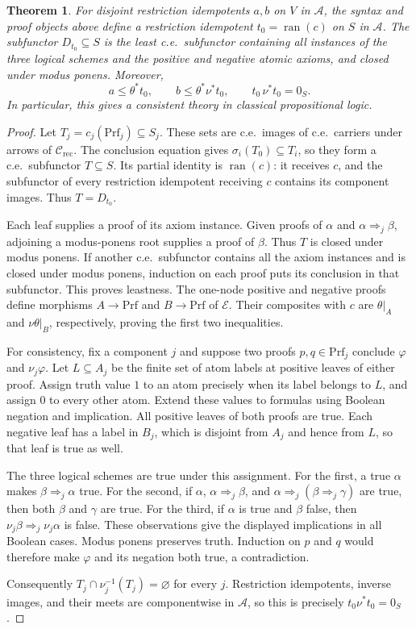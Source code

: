 \documentclass[11pt]{article}
\newtheorem{theorem}{Theorem}[section]
\newcommand{\ran}{\operatorname{ran}}
\begin{document}
\begin{theorem}\label{thm:fork-proof-presentation}
For disjoint restriction idempotents $a,b$ on $V$ in $\mathcal A$, the syntax and
proof objects above define a restriction idempotent $t_0=\ran(c)$ on $S$ in
$\mathcal A$. The subfunctor $D_{t_0}\subseteq S$ is the least c.e.\
subfunctor containing all instances of the three logical schemes and the
positive and negative atomic axioms, and closed under modus ponens.
Moreover,
\[
 a\le\theta^*t_0,\qquad
 b\le\theta^*\nu^*t_0,\qquad
 t_0\,\nu^*t_0=0_S.
\]
In particular, this gives a consistent theory in classical propositional logic.
\end{theorem}
\begin{proof}
Let $T_j=c_j(\mathrm{Prf}_j)\subseteq S_j$.
These sets are c.e.\ images of c.e.\ carriers under
arrows of $\mathcal C_{\mathrm{rec}}$. The conclusion equation gives
$\sigma_i(T_0)\subseteq T_i$, so they form a c.e.\
subfunctor $T\subseteq S$. Its partial identity is
$\ran(c)$: it receives $c$, and the subfunctor of every restriction
idempotent receiving $c$ contains its component images. Thus $T=D_{t_0}$.

Each leaf supplies a proof of its axiom instance. Given proofs
of $\alpha$ and $\alpha\Rightarrow_j\beta$, adjoining a
modus-ponens root supplies a proof of $\beta$. Thus $T$ is
closed under modus ponens. If another c.e.\ subfunctor contains all
the axiom instances and is closed under modus ponens, induction
on each proof puts its conclusion in that subfunctor. This
proves leastness. The one-node positive and negative proofs define
morphisms $A\to\mathrm{Prf}$ and $B\to\mathrm{Prf}$ of $\mathcal E$.
Their composites with $c$ are $\theta|_A$ and
$\nu\theta|_B$, respectively, proving the first two inequalities.

For consistency, fix a component $j$ and suppose two proofs
$p,q\in\mathrm{Prf}_j$ conclude $\varphi$ and $\nu_j\varphi$.
Let $L\subseteq A_j$ be the finite set of atom labels at
positive leaves of either proof. Assign truth value $1$ to an
atom precisely when its label belongs to $L$, and assign $0$
to every other atom. Extend these values to formulas using
Boolean negation and implication.
All positive leaves of both proofs are true. Each negative
leaf has a label in $B_j$, which is disjoint from $A_j$ and
hence from $L$, so that leaf is true as well.

The three logical schemes are true under this assignment.
For the first, a true $\alpha$ makes
$\beta\Rightarrow_j\alpha$ true. For the second, if
$\alpha$, $\alpha\Rightarrow_j\beta$, and
$\alpha\Rightarrow_j(\beta\Rightarrow_j\gamma)$ are true,
then both $\beta$ and $\gamma$ are true. For the third, if
$\alpha$ is true and $\beta$ false, then
$\nu_j\beta\Rightarrow_j\nu_j\alpha$ is false.
These observations give the displayed implications in all
Boolean cases. Modus ponens preserves truth. Induction on
$p$ and $q$ would therefore make $\varphi$ and its negation
both true, a contradiction.

Consequently $T_j\cap\nu_j^{-1}(T_j)=\varnothing$ for every
$j$. Restriction idempotents, inverse images, and their meets are componentwise
in $\mathcal A$, so this is precisely $t_0\nu^*t_0=0_S$.
\end{proof}
\end{document}
